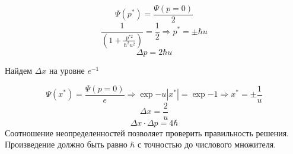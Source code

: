  $$\Psi(p^*)=\frac{\Psi(p=0)}{2}$$
 $$\frac{1}{(1+\frac{p^{*2}}{\hbar ^2u^2})}=\frac12 \Longrightarrow p^*=\pm \hbar u $$ 
 $$\Delta p=2\hbar u$$

Найдем $\Delta x$ на уровне $e^{-1}$

$$\Psi(x^*)=\frac{\Psi(p=0)}{e} \Longrightarrow \exp{-u|x^*|}=\exp{-1} \Longrightarrow x^*=\pm \frac{1}{u}$$
 $$\Delta x=\frac{2}{u}$$
 $$\Delta x \cdot \Delta p= 4\hbar$$
 Соотношение неопределенностей позволяет проверить правильность решения. Произведение должно быть равно $\hbar$ с точностью до числового множителя.